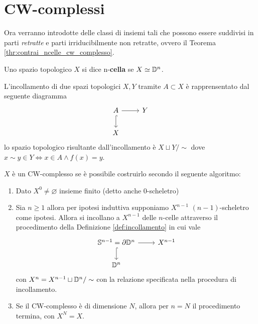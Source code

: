 \section{CW-complessi}

Ora verranno introdotte delle classi di insiemi tali che possono essere suddivisi in parti \textit{retratte} e parti irriducibilmente non retratte, ovvero il Teorema \ref{thr:contrai_ncelle_cw_complesso}.

\begin{definition}
	Uno spazio topologico $X$ si dice n-\textbf{cella} se $X \simeq \mathbb{D}^n$.
\end{definition}

\begin{definition}
	\label{def:incollamento}
	L'incollamento di due spazi topologici $X,Y$ tramite $A \subset X$ è rapprensentato dal seguente diagramma
	\begin{equation}
	\begin{tikzcd}
	A \arrow[d, hook]{i} \arrow[r]{f} & Y \\
	X
	\end{tikzcd}
	\end{equation} 
	lo spazio topologico risultante dall'incollamento è $X \sqcup Y / \sim$ dove $x \sim y \in Y \Longleftrightarrow x \in A \land f(x) = y$.
\end{definition}

\begin{definition}
	$X$ è un CW-complesso se è possibile costruirlo secondo il seguente algoritmo:
	\begin{enumerate}
		\item Dato $X^0 \neq \varnothing$ insieme finito (detto anche $0$-scheletro)
		\item Sia $n \ge 1$ allora per ipotesi induttiva supponiamo $X^{n-1}$ $(n-1)$-scheletro come ipotesi. Allora si incollano a $X^{n-1}$ delle $n$-celle attraverso il procedimento della Definizione \ref{def:incollamento} in cui vale 
		\begin{equation*}
		\begin{tikzcd}
			\S^{n-1} = \partial \D^n \arrow[d, hook]{i} \arrow[r]{f} & X^{n-1} \\
			\D^n
		\end{tikzcd}
		\end{equation*} 
		con $X^n = X^{n-1} \sqcup \mathbb{D}^n / \sim$ con la relazione specificata nella procedura di incollamento.
		\item Se il CW-complesso è di dimensione $N$, allora per $n = N$ il procedimento termina, con $X^N = X$.  
	\end{enumerate}
\end{definition}

